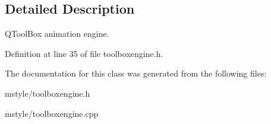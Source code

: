 \subsection{Detailed Description}
Q\+Tool\+Box animation engine. 

Definition at line 35 of file toolboxengine.\+h.



The documentation for this class was generated from the following files\+:\begin{DoxyCompactItemize}
\item 
mstyle/toolboxengine.\+h\item 
mstyle/toolboxengine.\+cpp\end{DoxyCompactItemize}
